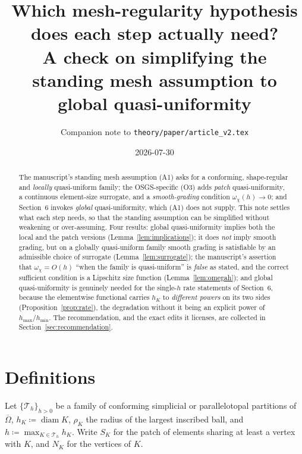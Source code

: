 \documentclass[11pt,a4paper]{article}
\title{Which mesh-regularity hypothesis does each step actually need?\\
\large A check on simplifying the standing mesh assumption to global quasi-uniformity}
\author{Companion note to \texttt{theory/paper/article\_v2.tex}}
\date{2026-07-30}
\theoremstyle{definition}
\newcommand{\Th}{\mathcal{T}_h}
\begin{document}
\maketitle

\begin{abstract}
The manuscript's standing mesh assumption (A1) asks for a conforming, shape-regular and
\emph{locally} quasi-uniform family; the OSGS-specific (O3) adds \emph{patch} quasi-uniformity, a
continuous element-size surrogate, and a \emph{smooth-grading} condition $\omega_\chi(h)\to0$; and
Section~6 invokes \emph{global} quasi-uniformity, which (A1) does not supply. This note settles what
each step needs, so that the standing assumption can be simplified without weakening or
over-assuming. Four results: global quasi-uniformity implies both the local and the patch versions
(Lemma~\ref{lem:implications}); it does \emph{not} imply smooth grading, but on a globally
quasi-uniform family smooth grading is satisfiable by an admissible choice of surrogate
(Lemma~\ref{lem:surrogate}); the manuscript's assertion that $\omega_\chi=O(h)$ ``when the family is
quasi-uniform'' is \emph{false} as stated, and the correct sufficient condition is a Lipschitz size
function (Lemma~\ref{lem:omegah}); and global quasi-uniformity is genuinely needed for the
single-$h$ rate statements of Section~6, because the elementwise functional carries $h_K$ to
\emph{different powers} on its two sides (Proposition~\ref{prop:rate}), the degradation without it
being an explicit power of $h_{\max}/h_{\min}$. The recommendation, and the exact edits it licenses,
are collected in Section~\ref{sec:recommendation}.
\end{abstract}

\section{Definitions}

Let $\{\Th\}_{h>0}$ be a family of conforming simplicial or parallelotopal partitions of
$\overline\Omega$, $h_K\coloneqq\operatorname{diam}K$, $\rho_K$ the radius of the largest inscribed
ball, and $h\coloneqq\max_{K\in\Th}h_K$. Write $S_K$ for the patch of elements sharing at least a
vertex with $K$, and $N_K$ for the vertices of $K$.
\end{document}
